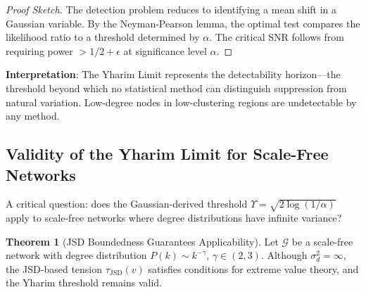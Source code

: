 \documentclass[11pt,a4paper]{article}
\theoremstyle{definition}
\newtheorem{theorem}{Theorem}[section]
\theoremstyle{remark}
\newcommand{\Graph}{\mathcal{G}}
\newcommand{\Yharim}{\Upsilon}
\begin{document}
\begin{proof}[Proof Sketch]
The detection problem reduces to identifying a mean shift in a Gaussian variable. By the Neyman-Pearson lemma, the optimal test compares the likelihood ratio to a threshold determined by $\alpha$. The critical SNR follows from requiring power $> 1/2 + \epsilon$ at significance level $\alpha$.
\end{proof}

\textbf{Interpretation}: The Yharim Limit represents the detectability horizon---the threshold beyond which no statistical method can distinguish suppression from natural variation. Low-degree nodes in low-clustering regions are undetectable by any method.

\subsection{Validity of the Yharim Limit for Scale-Free Networks}

A critical question: does the Gaussian-derived threshold $\Yharim = \sqrt{2\log(1/\alpha)}$ apply to scale-free networks where degree distributions have infinite variance?

\begin{theorem}[JSD Boundedness Guarantees Applicability]
\label{thm:jsd-scalefree}
Let $\Graph$ be a scale-free network with degree distribution $P(k) \sim k^{-\gamma}$, $\gamma \in (2, 3)$. Although $\sigma_d^2 = \infty$, the JSD-based tension $\tau_{\text{JSD}}(v)$ satisfies conditions for extreme value theory, and the Yharim threshold remains valid.
\end{theorem}
\end{document}
